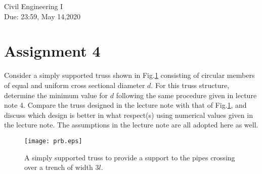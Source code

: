 \documentclass[10pt,a4j]{article}
\newlength{\minitwocolumn}
\begin{document}
\newcommand{\fat}[1]{\mbox{\boldmath $#1$}}
\newcommand{\D}{\partial}
\newcommand{\w}{\omega}
\newcommand{\ga}{\alpha}
\newcommand{\gb}{\beta}
\newcommand{\gx}{\xi}
\newcommand{\gz}{\zeta}
\newcommand{\vhat}[1]{\hat{\fat{#1}}}
\newcommand{\spc}{\vspace{0.7\baselineskip}}
\newcommand{\halfspc}{\vspace{0.3\baselineskip}}

\newcommand{\twofig}[2]
 {
   \begin{figure}
     \begin{minipage}[t]{\minitwocolumn}
         \begin{center}   #1
         \end{center}
     \end{minipage}
         \hspace{\columnsep}
     \begin{minipage}[t]{\minitwocolumn}
         \begin{center} #2
         \end{center}
     \end{minipage}
   \end{figure}
 }
\begin{flushright}
	{Civil Engineering I \\ 
	Due: 23:59, May 14,2020
	}
\end{flushright}
\hspace{10mm}
\section*{Assignment 4}
Consider a simply supported truss shown in Fig.\ref{fig:prb} consisting 
of circular members of equal and uniform cross sectional diameter $d$. 
For this truss structure, determine the minimum value for $d$ following 
the same procedure given in lecture note 4. Compare the truss designed 
in the lecture note with that of Fig.\ref{fig:prb}, and discuss which 
design is better in what respect(s) using numerical values given 
in the lecture note. The assumptions in the lecture note are all 
adopted here as well. 
    \begin{figure}[h]
        \begin{center}
        \texttt{[image: prb.eps]} 
        \end{center}
        \caption{
	A simply supported truss to provide a support to the pipes crossing over a trench of width $3l$.
	  } 
        \label{fig:prb}
    \end{figure}
\end{document}
